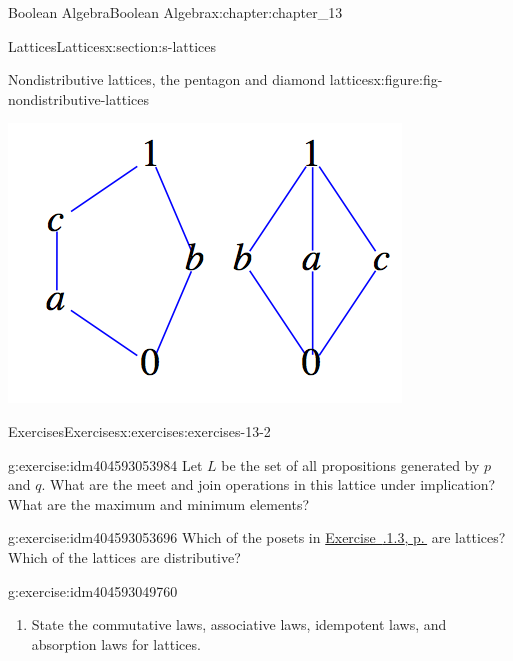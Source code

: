 \documentclass[twoside,10pt,]{book}
\newcommand{\xreffont}{\relax}
\numberwithin{equation}{section}
\begin{document}
\begin{chapterptx}{Boolean Algebra}{}{Boolean Algebra}{}{}{x:chapter:chapter_13}
\begin{sectionptx}{Lattices}{}{Lattices}{}{}{x:section:s-lattices}
\begin{figureptx}{Nondistributive lattices, the pentagon and diamond lattices}{x:figure:fig-nondistributive-lattices}{}%
\begin{image}{0.25}{0.5}{0.25}%
\includegraphics[width=\linewidth]{images/fig-nondistributive-lattices.png}
\end{image}%
\tcblower
\end{figureptx}%
%
%
\typeout{************************************************}
\typeout{************************************************}
%
\begin{exercises-subsection}{Exercises}{}{Exercises}{}{}{x:exercises:exercises-13-2}
\begin{divisionexercise}{1}{}{}{g:exercise:idm404593053984}%
Let \(L\) be the set of all propositions generated by \(p\) and \(q\).  What are the meet and join operations in this lattice under implication?   What are the maximum and minimum elements?%
\end{divisionexercise}%
\begin{divisionexercise}{2}{}{}{g:exercise:idm404593053696}%
Which of the posets in \hyperlink{x:exercise:exercise-13-1-3}{Exercise~{\xreffont 13.1.1.3}, p.\,\pageref{x:exercise:exercise-13-1-3}} are lattices? Which of the lattices are distributive?%
\end{divisionexercise}%
\begin{divisionexercise}{3}{}{}{g:exercise:idm404593049760}%
%
\begin{enumerate}[label=(\alph*)]
\item{}State the commutative laws, associative laws, idempotent laws, and absorption laws for lattices.%

\end{enumerate}
\end{divisionexercise}
\end{exercises-subsection}
\end{sectionptx}
\end{chapterptx}
\end{document}
